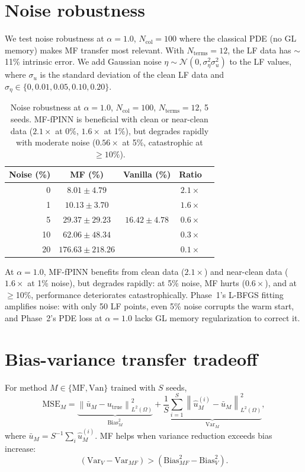 \documentclass[11pt]{article}
\newcommand{\Ncol}{N_{\mathrm{col}}}
\begin{document}
\section{Noise robustness}
\label{sec:noise}

We test noise robustness at $\alpha = 1.0$, $\Ncol = 100$ where the classical PDE (no GL memory) makes MF transfer most relevant. With $N_{\mathrm{terms}} = 12$, the LF data has $\sim$11\% intrinsic error. We add Gaussian noise $\eta \sim \mathcal{N}(0, \sigma_\eta^2 \sigma_u^2)$ to the LF values, where $\sigma_u$ is the standard deviation of the clean LF data and $\sigma_\eta \in \{0, 0.01, 0.05, 0.10, 0.20\}$.

\begin{table}[t]
\centering
\caption{Noise robustness at $\alpha = 1.0$, $\Ncol = 100$, $N_{\mathrm{terms}} = 12$, 5 seeds. MF-fPINN is beneficial with clean or near-clean data ($2.1\times$ at 0\%, $1.6\times$ at 1\%), but degrades rapidly with moderate noise ($0.56\times$ at 5\%, catastrophic at $\geq 10\%$).}
\label{tab:noise}
\begin{tabular}{rcccc}
\toprule
Noise (\%) & MF (\%) & Vanilla (\%) & Ratio \\
\midrule
0 & $8.01 \pm 4.79$ & \multirow{5}{*}{$16.42 \pm 4.78$} & $2.1\times$ \\
1 & $10.13 \pm 3.70$ & & $1.6\times$ \\
5 & $29.37 \pm 29.23$ & & $0.6\times$ \\
10 & $62.06 \pm 48.34$ & & $0.3\times$ \\
20 & $176.63 \pm 218.26$ & & $0.1\times$ \\
\bottomrule
\end{tabular}
\end{table}

At $\alpha = 1.0$, MF-fPINN benefits from clean data ($2.1\times$) and near-clean data ($1.6\times$ at 1\% noise), but degrades rapidly: at 5\% noise, MF hurts ($0.6\times$), and at $\geq$10\%, performance deteriorates catastrophically. Phase~1's L-BFGS fitting amplifies noise: with only 50 LF points, even 5\% noise corrupts the warm start, and Phase~2's PDE loss at $\alpha = 1.0$ lacks GL memory regularization to correct it.

\section{Bias-variance transfer tradeoff}
\label{sec:bvtt_supp}

For method $M \in \{\text{MF}, \text{Van}\}$ trained with $S$ seeds,
\begin{equation}
\label{eq:bvtt}
\mathrm{MSE}_M = \underbrace{\left\| \bar{u}_M - u_{\mathrm{true}} \right\|^2_{L^2(\Omega)}}_{\mathrm{Bias}^2_M} + \underbrace{\frac{1}{S}\sum_{i=1}^S \left\| \hat{u}^{(i)}_M - \bar{u}_M \right\|^2_{L^2(\Omega)}}_{\mathrm{Var}_M},
\end{equation}
where $\bar{u}_M = S^{-1}\sum_i \hat{u}^{(i)}_M$. MF helps when variance reduction exceeds bias increase:
\begin{equation}
(\mathrm{Var}_V - \mathrm{Var}_{MF}) > (\mathrm{Bias}^2_{MF} - \mathrm{Bias}^2_V).
\end{equation}
\end{document}
